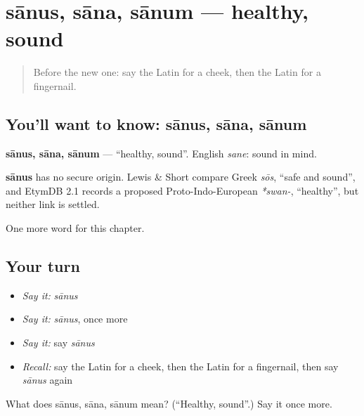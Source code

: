 \section[sānus, sāna, sānum]{sānus, sāna, sānum — healthy, sound}

\label{lesson:LA-C66-sanus}



\begin{quote}
Before the new one: say the Latin for a cheek, then the Latin for a fingernail.
\end{quote}

\subsection*{You'll want to know: sānus, sāna, sānum}
\textbf{sānus, sāna, sānum} — \textquotedblleft{}healthy, sound\textquotedblright{}. English \emph{sane}: sound in mind.

\begin{cousinweb}
\textbf{sānus} has no secure origin. Lewis \& Short compare Greek \emph{sōs}, \textquotedblleft{}safe and sound\textquotedblright{}, and EtymDB 2.1 records a proposed Proto-Indo-European \emph{*swan-}, \textquotedblleft{}healthy\textquotedblright{}, but neither link is settled.
\end{cousinweb}

\begin{grammarlens}[title={What you've built}]
One more word for this chapter.
\end{grammarlens}

\subsection*{Your turn}
\begin{itemize}
\raggedright
  \item \emph{Say it:} \emph{sānus}
  \item \emph{Say it:} \emph{sānus}, once more
  \item \emph{Say it:} say \emph{sānus}
  \item \emph{Recall:} say the Latin for a cheek, then the Latin for a fingernail, then say \emph{sānus} again
\end{itemize}

\begin{tcolorbox}[breakable,colback=teal!4,colframe=teal!35!black,title={Before you move on}]
What does sānus, sāna, sānum mean? (\textquotedblleft{}Healthy, sound\textquotedblright{}.) Say it once more.
\end{tcolorbox}
